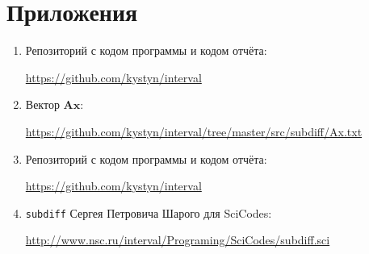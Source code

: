 \section{Приложения} \label{app}

\begin{enumerate}
	\item Репозиторий с кодом программы и кодом отчёта:
	
	\href{https://github.com/kystyn/interval}{https://github.com/kystyn/interval}
	
	\item Вектор $\mathbf{Ax}$:
	
	\href{https://github.com/kystyn/interval/tree/master/src/subdiff/Ax.txt}{https://github.com/kystyn/interval/tree/master/src/subdiff/Ax.txt}
	
	\item Репозиторий с кодом программы и кодом отчёта:
	
	\href{https://github.com/kystyn/interval}{https://github.com/kystyn/interval}
	
	\item \texttt{subdiff} Сергея Петровича Шарого для SciCodes:
	
	\href{http://www.nsc.ru/interval/Programing/SciCodes/subdiff.sci}{http://www.nsc.ru/interval/Programing/SciCodes/subdiff.sci}

\end{enumerate}